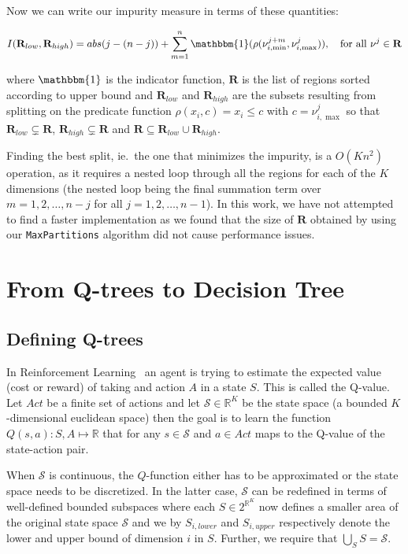 Now we can write our impurity measure in terms of these quantities:

\[
    I(\mathbf{R}_{low}, \mathbf{R}_{high}) = abs(j - (n - j)) +
    \sum^{n}_{m=1} \mathbbm{1}(\rho(\nu^{j+m}_{i,\min},\nu^{j}_{i,\max})), \quad
    \text{for all }\nu^{j} \in \mathbf{R}
\] 

where $\mathbbm{1}$ is the indicator function, $\mathbf{R}$ is the list of
regions sorted according to upper bound and $\mathbf{R}_{low}$ and
$\mathbf{R}_{high}$ are the subsets resulting from splitting on the predicate
function $\rho(x_i,c) = x_i \le c$ with $c = \nu^{j}_{i,\max}$ so that
$\mathbf{R}_{low} \subsetneq \mathbf{R}$, $\mathbf{R}_{high} \subsetneq
\mathbf{R}$ and $\mathbf{R} \subseteq \mathbf{R}_{low} \cup \mathbf{R}_{high}$.

Finding the best split, ie.\ the one that minimizes the impurity, is a $O(Kn^2)$
operation, as it requires a nested loop through all the regions for each
of the $K $dimensions (the nested loop being the final summation term over $m =
1, 2, \ldots, n - j$ for all $j = 1, 2, \ldots, n - 1$). In this work, we have
not attempted to find a faster implementation as we found that the size of
$\mathbf{R}$ obtained by using our \texttt{MaxPartitions} algorithm did not
cause performance issues.


\section{From Q-trees to Decision Tree}%
\label{sec:convergeToDT}

\subsection{Defining Q-trees}%
\label{subsec:defQTrees}

In Reinforcement Learning~\cite{Sutton1998} an agent is trying to estimate the
expected value (cost or reward) of taking and action $A$ in a state $S$. This is
called the Q-value. Let $Act$ be a finite set of actions and let $\mathcal{S}
\in \mathbb{R}^K$ be the state space (a bounded $K$-dimensional euclidean space)
then the goal is to learn the function $Q(s,a) : S, A \mapsto \mathbb{R}$ that
for any $s \in \mathcal{S}$ and $a \in Act$ maps to the Q-value of the
state-action pair.

When $\mathcal{S}$ is continuous, the $Q$-function either has to be approximated
or the state space needs to be discretized. In the latter case, $\mathcal{S}$
can be redefined in terms of well-defined bounded subspaces where each $S \in
2^{\mathbb{R}^{K}}$ now defines a smaller area of the original state space
$\mathcal{S}$ and we by $S_{i,lower}$ and $S_{i,upper}$ respectively denote the lower and
upper bound of dimension $i$ in $S$. Further, we require that $\bigcup_S S =
\mathcal{S}$.


